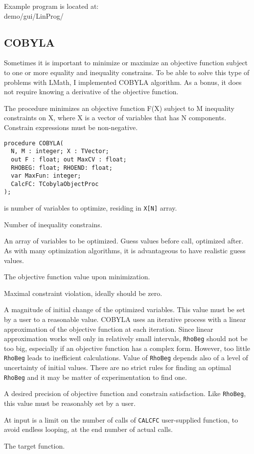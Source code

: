 \documentclass[12pt,a4paper,oneside]{article}
\newcommand{\code}[1]{\texttt{#1}}
\begin{document}
Example program is located at:\\
demo/gui/LinProg/
\subsection{COBYLA}\label{sec:cobyla}
Sometimes it is important to minimize or maximize an objective function subject to one or more equality and inequality constrains. To be able to solve this type of problems with LMath, I implemented COBYLA algorithm. As a bonus, it does not require knowing a derivative of the objective function.

The procedure minimizes an objective function F(X) subject to M inequality constraints on X, where X is a vector of variables that has N components. Constrain expressions must be non-negative. 
\begin{verbatim}
procedure COBYLA(
  N, M : integer; X : TVector;  
  out F : float; out MaxCV : float;  
  RHOBEG: float; RHOEND: float; 
  var MaxFun: integer;
  CalcFC: TCobylaObjectProc
);
\end{verbatim}
\begin{description}[noitemsep]
	\item[N] is number of variables to optimize, residing in \code{X[N]} array.
	\item[M] Number of inequality constrains.
	\item[X] An array of variables to be optimized. Guess values before call, optimized after. As with many optimization algorithms, it is advantageous to have realistic guess values.
	\item[F] The objective function value upon minimization.
	\item[MaxCV] Maximal constraint violation, ideally should be zero.
	\item[RhoBeg]\label{cobyla:rhobeg} A magnitude of initial change of the optimized variables. This value must be set by a user to a reasonable value. COBYLA uses an iterative process with a linear approximation of the objective function at each iteration. Since linear approximation works well only in relatively small intervals, \code{RhoBeg} should not be too big, especially if an objective function has a complex form. However, too little \code{RhoBeg} leads to inefficient calculations. Value of \code{RhoBeg} depends also of a level of uncertainty of initial values. There are no strict rules for finding an optimal \code{RhoBeg} and it may be matter of experimentation to find one.
	\item[RhoEnd] A desired precision of objective function and constrain satisfaction. Like \code{RhoBeg}, this value must be reasonably set by a user.
	\item[MaxFun] At input is a limit on the number of calls of \code{CALCFC} user-supplied function, to avoid endless looping, at the end number of actual calls. 
	\item[CalcFC] The target function.
\end{description}
\end{document}
